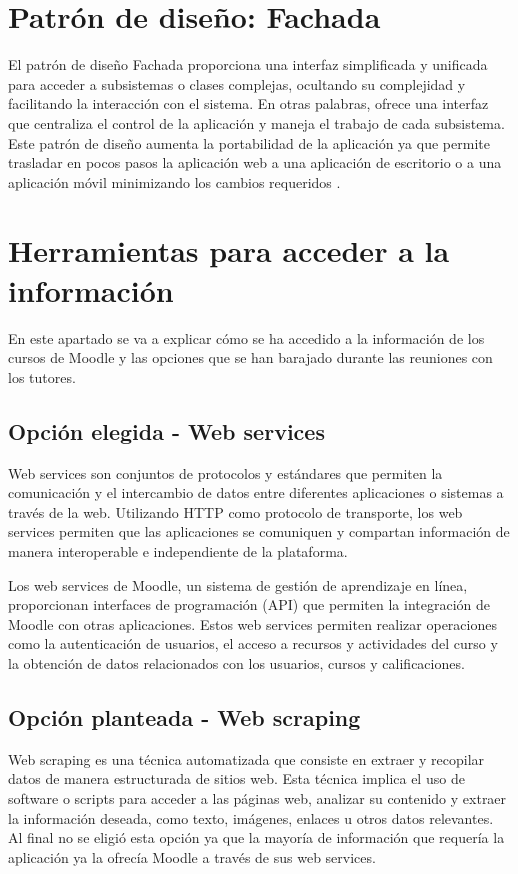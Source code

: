 \section{Patrón de diseño: Fachada}
El patrón de diseño Fachada proporciona una interfaz simplificada y unificada para acceder a subsistemas o clases complejas, ocultando su complejidad y facilitando la interacción con el sistema. En otras palabras, ofrece una interfaz que centraliza el control de la aplicación y maneja el trabajo de cada subsistema.
Este patrón de diseño aumenta la portabilidad de la aplicación ya que permite trasladar en pocos pasos la aplicación web a una aplicación de escritorio o a una aplicación móvil minimizando los cambios requeridos \cite{mendia2019}.

 \section{Herramientas para acceder a la información}
En este apartado se va a explicar cómo se ha accedido a la información de los cursos de Moodle y las opciones que se han barajado durante las reuniones con los tutores.
\subsection{Opción elegida - Web services}
Web services son conjuntos de protocolos y estándares que permiten la comunicación y el intercambio de datos entre diferentes aplicaciones o sistemas a través de la web. Utilizando HTTP como protocolo de transporte, los web services permiten que las aplicaciones se comuniquen y compartan información de manera interoperable e independiente de la plataforma.

Los web services de Moodle, un sistema de gestión de aprendizaje en línea, proporcionan interfaces de programación (API) que permiten la integración de Moodle con otras aplicaciones. Estos web services permiten realizar operaciones como la autenticación de usuarios, el acceso a recursos y actividades del curso y la obtención de datos relacionados con los usuarios, cursos y calificaciones.
\subsection{Opción planteada - Web scraping}
Web scraping es una técnica automatizada que consiste en extraer y recopilar datos de manera estructurada de sitios web. Esta técnica implica el uso de software o scripts para acceder a las páginas web, analizar su contenido y extraer la información deseada, como texto, imágenes, enlaces u otros datos relevantes.
Al final no se eligió esta opción ya que la mayoría de información que requería la aplicación ya la ofrecía Moodle a través de sus web services.

